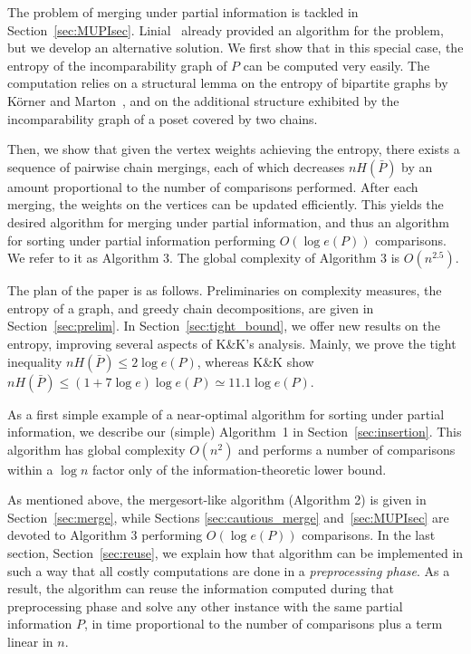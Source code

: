 \documentclass{article} \usepackage{fullpage}
\begin{document}
The problem of merging under partial information is tackled in Section~\ref{sec:MUPIsec}. Linial~\cite{L84} already provided an algorithm for the problem, but we develop an alternative solution. We first show that in this special case, the entropy of the incomparability graph of $P$ can be computed very easily. The computation relies on a structural lemma on the entropy of bipartite graphs by K\"orner and Marton~\cite{KM88}, and on the additional structure exhibited by the incomparability graph of a poset covered by two chains.

Then, we show that given the vertex weights achieving the entropy, there exists a sequence of pairwise chain mergings, each of which decreases $nH(\bar{P})$ by an amount proportional to the number of comparisons performed. After each merging, the weights on the vertices can be updated efficiently. This yields the desired algorithm for merging under partial information, and thus an algorithm for sorting under partial information performing $O(\log e(P))$ comparisons. We refer to it as Algorithm 3. The global complexity of Algorithm 3 is $O(n^{2.5})$.

The plan of the paper is as follows. Preliminaries on complexity measures, the entropy of a graph, and greedy chain decompositions, are given in Section~\ref{sec:prelim}. In Section~\ref{sec:tight_bound}, we offer new results on the entropy, improving several aspects of K\&K's analysis. Mainly, we prove the tight inequality $nH(\bar{P}) \leq 2 \log e(P)$, whereas K\&K show $nH(\bar{P}) \leq (1+7\log e) \log e(P) \simeq 11.1 \log e(P)$.

As a first simple example of a near-optimal algorithm for sorting under partial information, we describe our (simple) Algorithm~1 in Section~\ref{sec:insertion}. This algorithm has global complexity $O(n^2)$ and performs a number of comparisons within a $\log n$ factor only of the information-theoretic lower bound. 

As mentioned above, the mergesort-like algorithm (Algorithm 2) is given in Section~\ref{sec:merge},
while Sections \ref{sec:cautious_merge} and~\ref{sec:MUPIsec} are devoted to
Algorithm 3 performing $O(\log e(P))$ comparisons. In the last section, Section~\ref{sec:reuse}, we explain how that algorithm can be implemented in such a way that all costly computations are done in a {\em preprocessing phase}. As a result, the algorithm can reuse the information computed during that preprocessing phase and solve any other instance with the same partial information $P$, in time proportional to the number of comparisons plus a term linear in $n$.
\end{document}
